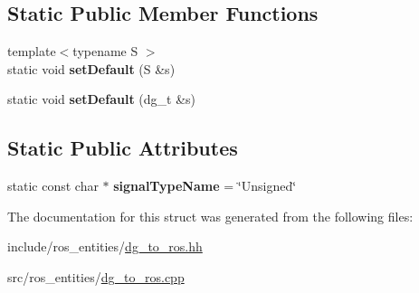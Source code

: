 \subsection*{Static Public Member Functions}
\begin{DoxyCompactItemize}
\item 
\mbox{\label{structdynamic__graph_1_1DgToRos_3_01unsigned_01int_01_4_abfb90bc3d058b0fa0fbdf330f9f5d1a2}} 
{\footnotesize template$<$typename S $>$ }\\static void {\bfseries set\+Default} (S \&s)
\item 
\mbox{\label{structdynamic__graph_1_1DgToRos_3_01unsigned_01int_01_4_a66d4d5c633e9930bd93ac4dff834df35}} 
static void {\bfseries set\+Default} (dg\+\_\+t \&s)
\end{DoxyCompactItemize}
\subsection*{Static Public Attributes}
\begin{DoxyCompactItemize}
\item 
\mbox{\label{structdynamic__graph_1_1DgToRos_3_01unsigned_01int_01_4_a90b168f7b37e418e8c5ad1825c5abb36}} 
static const char $\ast$ {\bfseries signal\+Type\+Name} = \char`\"{}Unsigned\char`\"{}
\end{DoxyCompactItemize}


The documentation for this struct was generated from the following files\+:\begin{DoxyCompactItemize}
\item 
include/ros\+\_\+entities/\hyperlink{dg__to__ros_8hh}{dg\+\_\+to\+\_\+ros.\+hh}\item 
src/ros\+\_\+entities/\hyperlink{dg__to__ros_8cpp}{dg\+\_\+to\+\_\+ros.\+cpp}\end{DoxyCompactItemize}
